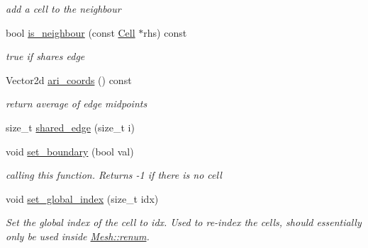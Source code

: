 \begin{DoxyCompactItemize}
\begin{DoxyCompactList}\small\item\em add a cell to the neighbour \end{DoxyCompactList}\item 
\mbox{\label{classHArDCore2D_1_1Cell_ac752606c3c705df6140e20d3c7ae45a2}} 
bool \hyperlink{classHArDCore2D_1_1Cell_ac752606c3c705df6140e20d3c7ae45a2}{is\+\_\+neighbour} (const \hyperlink{classHArDCore2D_1_1Cell}{Cell} $\ast$rhs) const
\begin{DoxyCompactList}\small\item\em true if shares edge \end{DoxyCompactList}\item 
\mbox{\label{classHArDCore2D_1_1Cell_a23fe549c562fac9ca1eef82c04948546}} 
Vector2d \hyperlink{classHArDCore2D_1_1Cell_a23fe549c562fac9ca1eef82c04948546}{ari\+\_\+coords} () const
\begin{DoxyCompactList}\small\item\em return average of edge midpoints \end{DoxyCompactList}\item 
size\+\_\+t \hyperlink{classHArDCore2D_1_1Cell_a80ddbe4dea925baeec6da304a0873a2c}{shared\+\_\+edge} (size\+\_\+t i)
\item 
void \hyperlink{classHArDCore2D_1_1Cell_ac4332b689450ab38b5c77ae9f5ff0809}{set\+\_\+boundary} (bool val)
\begin{DoxyCompactList}\small\item\em calling this function. Returns -\/1 if there is no cell \end{DoxyCompactList}\item 
\mbox{\label{classHArDCore2D_1_1Cell_a65ac02c8ef4407d5c0693ae97d24c45a}} 
void \hyperlink{classHArDCore2D_1_1Cell_a65ac02c8ef4407d5c0693ae97d24c45a}{set\+\_\+global\+\_\+index} (size\+\_\+t idx)
\begin{DoxyCompactList}\small\item\em Set the global index of the cell to idx. Used to re-\/index the cells, should essentially only be used inside \hyperlink{classHArDCore2D_1_1Mesh_af77873bbc892a7a5b37bf4773c55aefc}{Mesh\+::renum}. \end{DoxyCompactList}\end{DoxyCompactItemize}



